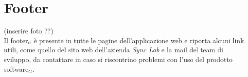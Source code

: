 \section{Footer}\label{UtilizzoDiGDPGatheringDetecionPlatformFooter}
(inserire foto ??) \\
Il footer$_{\scaleto{G}{3pt}}$ è presente in tutte le pagine dell'applicazione web e riporta alcuni link utili, come quello del sito web dell'azienda \textit{Sync Lab} e la mail del team di sviluppo, da contattare in caso si riscontrino problemi con l'uso del prodotto software$_G$. 


